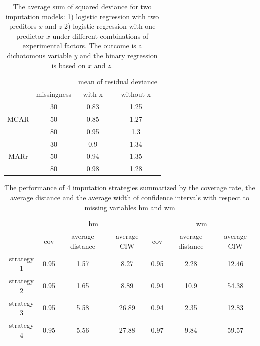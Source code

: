 	\begin{table}[ht!]
		\begin{tabular}{cc|cc}
			&             & \multicolumn{2}{c}{mean of residual deviance} \\ \cline{2-4} 
			\multicolumn{1}{c|}{}     & missingness & with x               & without x               \\
			\multicolumn{1}{c|}{}     & 30          & 0.83                 & 1.25                    \\
			\multicolumn{1}{c|}{MCAR} & 50          & 0.85                 & 1.27                    \\
			\multicolumn{1}{c|}{}     & 80          & 0.95                 & 1.3                     \\ \hline
			\multicolumn{1}{c|}{}     & 30          & 0.9                  & 1.34                    \\
			\multicolumn{1}{c|}{MARr} & 50          & 0.94                 & 1.35                    \\
			\multicolumn{1}{c|}{}     & 80          & 0.98                 & 1.28                   
		\end{tabular}
		\caption{The average sum of squared deviance for two imputation models: 1) logistic regression with two preditors $x$ and $z$ 2) logistic regression with one predictor $x$ under different combinations of experimental factors. The outcome is a dichotomous variable $y$ and the binary regression is based on $x$ and $z$.}
		\label{tab6_5}
	\end{table}
	
	\begin{table}[ht!]
		\begin{tabular}{c|ccc|ccc}
			& \multicolumn{3}{c|}{hm}               & \multicolumn{3}{c}{wm}                \\ \cline{2-7} 
			& cov  & average distance & average CIW & cov  & average distance & average CIW \\
			strategy 1 & 0.95 & 1.57             & 8.27        & 0.95 & 2.28             & 12.46       \\
			strategy 2 & 0.95 & 1.65             & 8.89        & 0.94 & 10.9             & 54.38       \\
			strategy 3 & 0.95 & 5.58             & 26.89       & 0.94 & 2.35             & 12.83       \\
			strategy 4 & 0.95 & 5.56             & 27.88       & 0.97 & 9.84             & 59.57      
		\end{tabular}
		\caption{The performance of 4 imputation strategies summarized by the coverage rate, the average distance and the average width of confidence intervals with respect to missing variables hm and wm}
		\label{tab6_6}
	\end{table}
	
